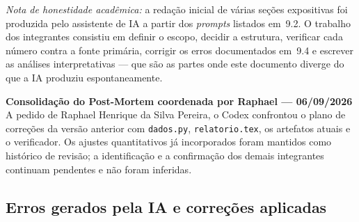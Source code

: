 \documentclass[11pt,a4paper]{article}
\newcommand{\destaque}[2]{%
  \begin{center}\begin{minipage}{0.96\textwidth}
  \colorbox{fundo}{\begin{minipage}{\dimexpr\linewidth-2\fboxsep}
  \vspace{3pt}\textbf{\color{azul}#1}\\[2pt]\small #2\vspace{4pt}
  \end{minipage}}\end{minipage}\end{center}}
\begin{document}
\emph{Nota de honestidade acadêmica:} a redação inicial de várias seções expositivas foi
produzida pelo assistente de IA a partir dos \emph{prompts} listados em~9.2. O trabalho dos
integrantes consistiu em definir o escopo, decidir a estrutura, verificar cada número
contra a fonte primária, corrigir os erros documentados em~9.4 e escrever as análises
interpretativas --- que são as partes onde este documento diverge do que a IA produziu
espontaneamente.

\destaque{Consolidação do Post-Mortem coordenada por Raphael --- 06/09/2026}{%
A pedido de Raphael Henrique da Silva Pereira, o Codex confrontou o plano de correções da versão anterior com
\texttt{dados.py}, \texttt{relatorio.tex}, os artefatos atuais e o verificador. Os ajustes
quantitativos já incorporados foram mantidos como histórico de revisão; a identificação e a
confirmação dos demais integrantes continuam pendentes e não foram inferidas.}

\subsection{Erros gerados pela IA e correções aplicadas}
\end{document}
